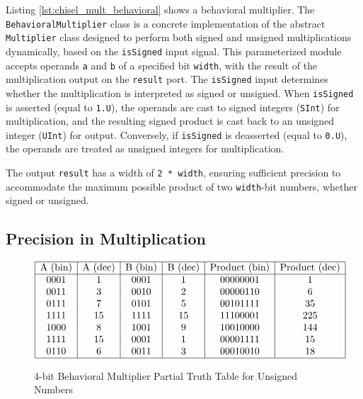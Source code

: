 {Listing \ref{lst:chisel_mult_behavioral} shows a behavioral multiplier. The \texttt{BehavioralMultiplier} class is a concrete implementation of the abstract \texttt{Multiplier} class designed to perform both signed and unsigned multiplications dynamically, based on the \texttt{isSigned} input signal. This parameterized module accepts operands \texttt{a} and \texttt{b} of a specified bit \texttt{width}, with the result of the multiplication output on the \texttt{result} port. The \texttt{isSigned} input determines whether the multiplication is interpreted as signed or unsigned. When \texttt{isSigned} is asserted (equal to \texttt{1.U}), the operands are cast to signed integers (\texttt{SInt}) for multiplication, and the resulting signed product is cast back to an unsigned integer (\texttt{UInt}) for output. Conversely, if \texttt{isSigned} is deasserted (equal to \texttt{0.U}), the operands are treated as unsigned integers for multiplication.

The output \texttt{result} has a width of \texttt{2 * width}, ensuring sufficient precision to accommodate the maximum possible product of two \texttt{width}-bit numbers, whether signed or unsigned. 

}%

\subsection{Precision in Multiplication}

\begin{figure}[H]
    \centering
\[
\begin{array}{|c|c|c|c|c|c|}
\hline
\text{A (bin)} & \text{A (dec)} & \text{B (bin)} & \text{B (dec)} & \text{Product (bin)} & \text{Product (dec)} \\
\hline
0001 & 1 & 0001 & 1 & 00000001 & 1 \\
0011 & 3 & 0010 & 2 & 00000110 & 6 \\
0111 & 7 & 0101 & 5 & 00101111 & 35 \\
1111 & 15 & 1111 & 15 & 11100001 & 225 \\
1000 & 8 & 1001 & 9 & 10010000 & 144 \\
1111 & 15 & 0001 & 1 & 00001111 & 15 \\
0110 & 6 & 0011 & 3 & 00010010 & 18 \\
\hline
\end{array}
\]
    \caption{4-bit Behavioral Multiplier Partial Truth Table for Unsigned Numbers}
    \label{fig:4bit_multiplier_tt_unsigned}
\end{figure}

